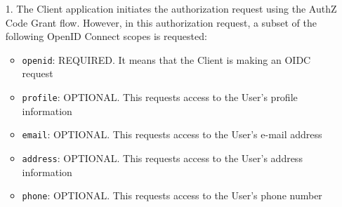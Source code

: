 \documentclass[a4paper,12pt]{article}
\begin{document}
\begin{itemize}
    \item[1.] The Client application initiates the authorization request using the AuthZ Code Grant flow. However, in this authorization request, a subset of the following OpenID Connect scopes is requested:
    \item[] \begin{itemize}
        \item \texttt{openid}: REQUIRED. It means that the Client is making an OIDC request
        \item \texttt{profile}: OPTIONAL. This requests access to the User's
    profile information
        \item \texttt{email}: OPTIONAL. This requests access to the User's e-mail address
        \item \texttt{address}: OPTIONAL. This requests access to the User's  address information
        \item \texttt{phone}: OPTIONAL. This requests access to the User's phone number
    \end{itemize}
    

\end{itemize}
\end{document}
